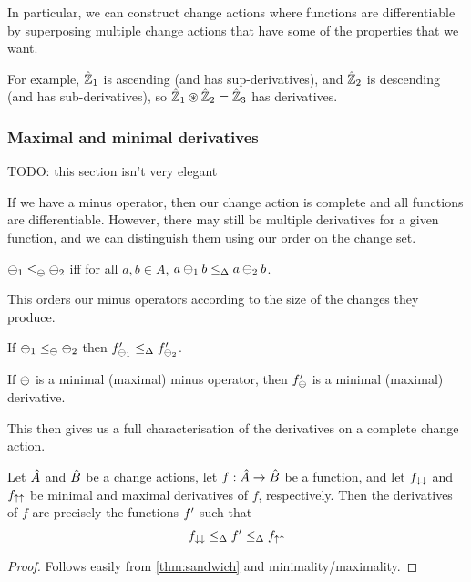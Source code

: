 In particular, we can construct change actions where functions are
differentiable by superposing multiple change actions that have some of the
properties that we want.

For example, $\hat{\mathbb{Z}}_1$ is ascending (and has sup-derivatives), and
$\hat{\mathbb{Z}}_2$ is descending (and has sub-derivatives), so $\hat{\mathbb{Z}}_1
\circledast \hat{\mathbb{Z}}_2 = \hat{\mathbb{Z}}_3$ has derivatives.

\subsubsection{Maximal and minimal derivatives}

TODO: this section isn't very elegant

If we have a minus operator, then our change action is complete and all
functions are differentiable. However, there may still be multiple derivatives
for a given function, and we can distinguish them using our order on the change
set.

\begin{defn}
  $\ominus_1 \leq_\ominus \ominus_2$ iff for all $a,b \in A$, $a \ominus_1 b
  \leq_\Delta a \ominus_2 b$.
\end{defn}

This orders our minus operators according to the size of the changes they
produce. 

\begin{prop}
  If $\ominus_1 \leq_\ominus \ominus_2$ then
  $f'_{\ominus_1} \leq_\Delta f'_{\ominus_2}$.
\end{prop}

\begin{prop}
  If $\ominus$ is a minimal (maximal) minus operator, then $f'_\ominus$
  is a minimal (maximal) derivative.
\end{prop}

This then gives us a full characterisation of the derivatives on a complete
change action.

\begin{thm}
\label{thm:derivativeCharacterization}
  Let $\hat{A}$ and $\hat{B}$ be a change actions, let
  $f: \hat{A} \rightarrow \hat{B}$ be a function, and let $f_{\downarrow\downarrow}$ and
  $f_{\uparrow\uparrow}$ be minimal and maximal derivatives of $f$, respectively.
  Then the derivatives of $f$ are precisely
  the functions $f'$ such that
  $$f_{\downarrow\downarrow} \leq_\Delta f' \leq_\Delta f_{\uparrow\uparrow}$$
\end{thm}
\ifproofs
\begin{proof}
  Follows easily from \cref{thm:sandwich} and minimality/maximality.
\end{proof}
\fi

